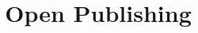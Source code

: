 \documentclass[11pt]{book}
\title{Open Publishing}
\author{}
\begin{document}
\maketitle
\def\title#1{\chapter{#1}}
\tableofcontents

        
        
\end{document}
